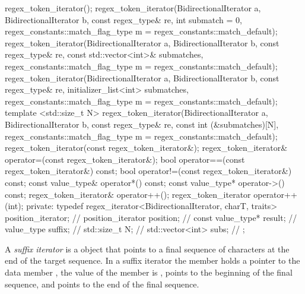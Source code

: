 \begin{codeblock}
{{    regex_token_iterator();
    regex_token_iterator(BidirectionalIterator a, BidirectionalIterator b, 
                        const regex_type& re, 
                        int submatch = 0, 
                        regex_constants::match_flag_type m =
                          regex_constants::match_default);
    regex_token_iterator(BidirectionalIterator a, BidirectionalIterator b, 
                        const regex_type& re, 
                        const std::vector<int>& submatches, 
                        regex_constants::match_flag_type m =
                          regex_constants::match_default);
    regex_token_iterator(BidirectionalIterator a, BidirectionalIterator b,
                        const regex_type& re,
                        initializer_list<int> submatches,
                        regex_constants::match_flag_type m =
                          regex_constants::match_default);
    template <std::size_t N>
      regex_token_iterator(BidirectionalIterator a, BidirectionalIterator b, 
                        const regex_type& re, 
                        const int (&submatches)[N], 
                        regex_constants::match_flag_type m =
                          regex_constants::match_default);
    regex_token_iterator(const regex_token_iterator&);
    regex_token_iterator& operator=(const regex_token_iterator&);
    bool operator==(const regex_token_iterator&) const;
    bool operator!=(const regex_token_iterator&) const;
    const value_type& operator*() const;
    const value_type* operator->() const;
    regex_token_iterator& operator++();
    regex_token_iterator operator++(int);
  private:
    typedef
      regex_iterator<BidirectionalIterator, charT, traits> position_iterator; // \expos
    position_iterator position;                                               // \expos
    const value_type* result;                                                 // \expos
    value_type suffix;                                                        // \expos
    std::size_t N;                                                            // \expos
    std::vector<int> subs;                                                    // \expos
  };
}
\end{codeblock}

\pnum
A \textit{suffix iterator} is a  object
that points to a final sequence of characters at
the end of the target sequence. In a suffix iterator the
member  holds a pointer to the data
member , the value of the member 
is ,  points to the beginning of the
final sequence, and  points to the end of the
final sequence. 

